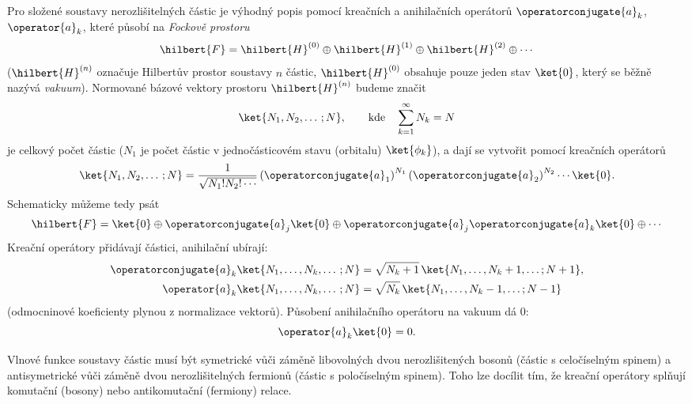 Pro složené	soustavy nerozlišitelných částic je výhodný popis pomocí kreačních 
a anihilačních operátorů $\operatorconjugate{a}_{k}$, $\operator{a}_{k}$, které působí na \emph{Fockově prostoru}
\begin{equation}
    \hilbert{F}
        =\hilbert{H}^{(0)}\oplus\hilbert{H}^{(1)}\oplus\hilbert{H}^{(2)}\oplus\dotsb
\end{equation}
($\hilbert{H}^{(n)}$ označuje Hilbertův prostor soustavy $n$ částic, 
$\hilbert{H}^{(0)}$ obsahuje pouze jeden stav $\ket{0}$, který se běžně nazývá \emph{vakuum}).
Normované bázové vektory prostoru $\hilbert{H}^{(n)}$ budeme značit
\begin{equation}
    \ket{N_{1},N_{2},\dotsc;N},
        \qquad\text{kde}\quad\sum_{k=1}^{\infty}N_{k}=N
\end{equation}
je celkový počet částic ($N_{1}$ je počet částic v jednočásticovém stavu (orbitalu) $\ket{\phi_{k}}$),
a dají se vytvořit pomocí kreačních operátorů
\begin{equation}
    \ket{N_{1},N_{2},\dotsc;N}
        =\frac{1}{\sqrt{N_{1}!N_{2}!\dotsm}}\left(\operatorconjugate{a}_{1}\right)^{N_{1}}\left(\operatorconjugate{a}_{2}\right)^{N_{2}}\dotsm\ket{0}.
\end{equation}	
Schematicky můžeme tedy psát
\begin{equation}
    \hilbert{F}
        =\ket{0}\oplus\operatorconjugate{a}_{j}\ket{0}\oplus\operatorconjugate{a}_{j}\operatorconjugate{a}_{k}\ket{0}\oplus\dotsb
\end{equation}	
Kreační operátory přidávají částici, anihilační ubírají:
\begin{subequations}
    \begin{align}
        \operatorconjugate{a}_{k}\ket{N_{1},\dotsc,N_{k},\dotsc;N}
            &=\sqrt{N_{k}+1}\,\ket{N_{1},\dotsc,N_{k}+1,\dots;N+1},\\
        \operator{a}_{k}\ket{N_{1},\dotsc,N_{k},\dotsc;N}
            &=\sqrt{N_{k}}\,\ket{N_{1},\dotsc,N_{k}-1,\dots;N-1}
    \end{align}        
\end{subequations}
(odmocninové koeficienty plynou z normalizace vektorů).
Působení anihilačního operátoru na vakuum dá $0$:
\begin{equation}
    \operator{a}_{k}\ket{0}=0.
\end{equation}

Vlnové funkce soustavy částic musí být symetrické vůči záměně libovolných dvou nerozlišitených bosonů
(částic s celočíselným spinem) a antisymetrické vůči záměně dvou nerozlišitelných fermionů
(částic s poločíselným spinem).
Toho lze docílit tím, že kreační operátory splňují komutační (bosony) nebo antikomutační (fermiony) relace.

